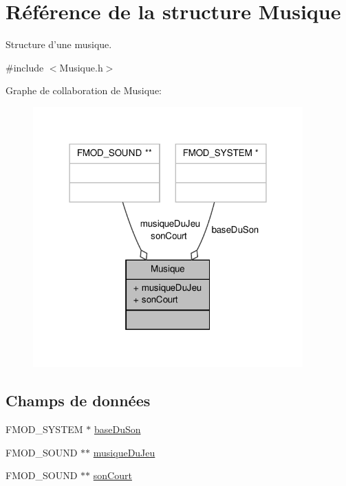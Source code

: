 \hypertarget{structMusique}{\section{Référence de la structure Musique}
\label{structMusique}
}


Structure d'une musique.  




{\ttfamily \#include $<$Musique.\-h$>$}



Graphe de collaboration de Musique\-:\nopagebreak
\begin{figure}[H]
\begin{center}
\leavevmode
\includegraphics[width=294pt]{structMusique__coll__graph}
\end{center}
\end{figure}
\subsection*{Champs de données}
\begin{DoxyCompactItemize}
\item 
F\-M\-O\-D\-\_\-\-S\-Y\-S\-T\-E\-M $\ast$ \hyperlink{structMusique_a5ac7591cc431a2ef548d48e9cf858d94}{base\-Du\-Son}
\item 
F\-M\-O\-D\-\_\-\-S\-O\-U\-N\-D $\ast$$\ast$ \hyperlink{structMusique_a442e0e2e689699e3bb72eb8c8e4e14c2}{musique\-Du\-Jeu}
\item 
F\-M\-O\-D\-\_\-\-S\-O\-U\-N\-D $\ast$$\ast$ \hyperlink{structMusique_ae957f32de4befa0f625f4b7229e3d660}{son\-Court}
\end{DoxyCompactItemize}


